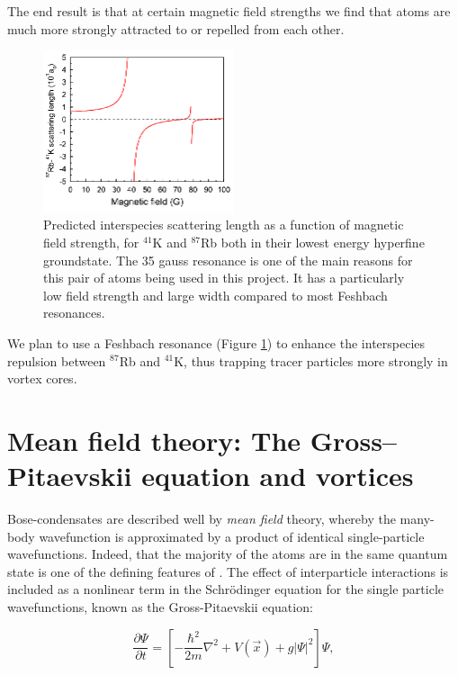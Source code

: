 The end result is that at certain magnetic field strengths we find that atoms are much more strongly attracted to or repelled from each other.

\begin{figure}%
\begin{center}
\includegraphics[width=0.5\textwidth]{figures/unsorted/feshKRb.png}
\caption{Predicted interspecies scattering length \cite{thalhammer_double_2008} as a function of magnetic field strength, for $^{41}$K and $^{87}$Rb both in their lowest energy hyperfine groundstate. The 35 gauss resonance is one of the main reasons for this pair of atoms being used in this project. It has a particularly low field strength and large width compared to most Feshbach resonances.}\label{fig:feshKRb}
\end{center}
\end{figure}

We plan to use a Feshbach resonance (Figure \ref{fig:feshKRb}) to enhance the interspecies repulsion between $^{87}$Rb and $^{41}$K, thus trapping tracer particles more strongly in vortex cores.


\section{Mean field theory: The Gross--Pitaevskii equation and vortices}

Bose-condensates are described well by \emph{mean field} theory, whereby the many-body wavefunction is approximated by a product of identical single-particle wavefunctions. Indeed, that the majority of the atoms are in the same quantum state is one of the defining features of \bec. The effect of interparticle interactions is included as a nonlinear term in the Schr\"odinger equation for the single particle wavefunctions, known as the Gross-Pitaevskii equation:

\begin{equation}
\frac{\partial \Psi}{\partial t} = \left[-\frac{\hbar^2}{2m}\nabla^2 + V(\vec{x}) + g|\Psi|^2\right]\Psi,
\end{equation}

